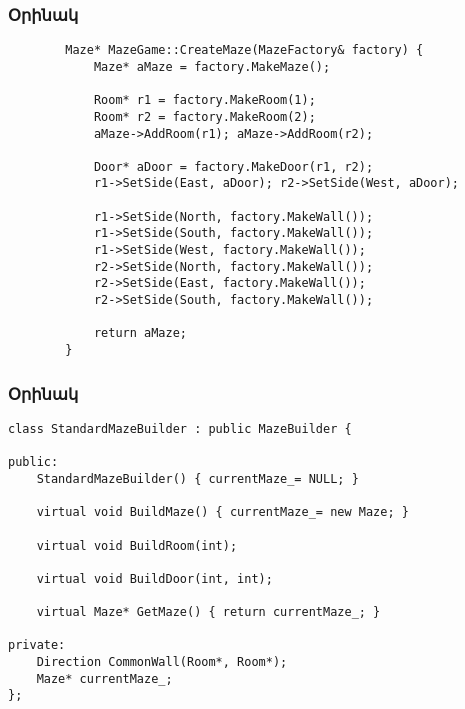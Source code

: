 \documentclass{beamer}
\begin{document}
\begin{frame}[fragile]\frametitle{Օրինակ}
\begin{english}
    \begin{verbatim}
        Maze* MazeGame::CreateMaze(MazeFactory& factory) {
            Maze* aMaze = factory.MakeMaze();

            Room* r1 = factory.MakeRoom(1);
            Room* r2 = factory.MakeRoom(2);
            aMaze->AddRoom(r1); aMaze->AddRoom(r2);

            Door* aDoor = factory.MakeDoor(r1, r2);
            r1->SetSide(East, aDoor); r2->SetSide(West, aDoor);

            r1->SetSide(North, factory.MakeWall());
            r1->SetSide(South, factory.MakeWall());
            r1->SetSide(West, factory.MakeWall());
            r2->SetSide(North, factory.MakeWall());
            r2->SetSide(East, factory.MakeWall());
            r2->SetSide(South, factory.MakeWall());

            return aMaze;
        }
    \end{verbatim}
\end{english}
\end{frame}

\begin{frame}[fragile]\frametitle{Օրինակ}
\begin{english}
\begin{verbatim}
class StandardMazeBuilder : public MazeBuilder {

public:
    StandardMazeBuilder() { currentMaze_= NULL; }

    virtual void BuildMaze() { currentMaze_= new Maze; }

    virtual void BuildRoom(int);

    virtual void BuildDoor(int, int);

    virtual Maze* GetMaze() { return currentMaze_; }

private:
    Direction CommonWall(Room*, Room*);
    Maze* currentMaze_;
};
\end{verbatim}
\end{english}
\end{frame}
\end{document}
